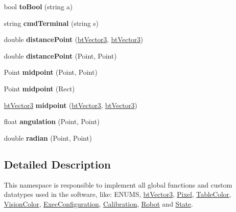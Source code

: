 \begin{DoxyCompactItemize}
\item 
bool {\bfseries to\+Bool} (string a)\hypertarget{namespacecommon_aed690e352783334b551a1c74947cb101}{}\label{namespacecommon_aed690e352783334b551a1c74947cb101}

\item 
string {\bfseries cmd\+Terminal} (string s)\hypertarget{namespacecommon_a5899229353a9bcf1570191eb9acea137}{}\label{namespacecommon_a5899229353a9bcf1570191eb9acea137}

\item 
double {\bfseries distance\+Point} (\hyperlink{structcommon_1_1btVector3}{bt\+Vector3}, \hyperlink{structcommon_1_1btVector3}{bt\+Vector3})\hypertarget{namespacecommon_ac8769b01d13707ef6598888005e643e9}{}\label{namespacecommon_ac8769b01d13707ef6598888005e643e9}

\item 
double {\bfseries distance\+Point} (Point, Point)\hypertarget{namespacecommon_a0319cc29ee430ecb0ca77d0f95cdc309}{}\label{namespacecommon_a0319cc29ee430ecb0ca77d0f95cdc309}

\item 
Point {\bfseries midpoint} (Point, Point)\hypertarget{namespacecommon_a2968370f29c08892258794b87bac33fb}{}\label{namespacecommon_a2968370f29c08892258794b87bac33fb}

\item 
Point {\bfseries midpoint} (Rect)\hypertarget{namespacecommon_a820e29c932b1f0b6a865772239beeb57}{}\label{namespacecommon_a820e29c932b1f0b6a865772239beeb57}

\item 
\hyperlink{structcommon_1_1btVector3}{bt\+Vector3} {\bfseries midpoint} (\hyperlink{structcommon_1_1btVector3}{bt\+Vector3}, \hyperlink{structcommon_1_1btVector3}{bt\+Vector3})\hypertarget{namespacecommon_a8018da38b6ea9b1dfa514730ad24ab2b}{}\label{namespacecommon_a8018da38b6ea9b1dfa514730ad24ab2b}

\item 
float {\bfseries angulation} (Point, Point)\hypertarget{namespacecommon_a8c1ef8d4ce3fdb3e30af47c9c11bf04a}{}\label{namespacecommon_a8c1ef8d4ce3fdb3e30af47c9c11bf04a}

\item 
double {\bfseries radian} (Point, Point)\hypertarget{namespacecommon_ac58a1918510dc4dbc7b65255593df38e}{}\label{namespacecommon_ac58a1918510dc4dbc7b65255593df38e}

\end{DoxyCompactItemize}


\subsection{Detailed Description}
This namespace is responsible to implement all global functions and custom datatypes used in the software, like\+: E\+N\+U\+MS, \hyperlink{structcommon_1_1btVector3}{bt\+Vector3}, \hyperlink{structcommon_1_1Pixel}{Pixel}, \hyperlink{structcommon_1_1TableColor}{Table\+Color}, \hyperlink{structcommon_1_1VisionColor}{Vision\+Color}, \hyperlink{structcommon_1_1ExecConfiguration}{Exec\+Configuration}, \hyperlink{structcommon_1_1Calibration}{Calibration}, \hyperlink{structcommon_1_1Robot}{Robot} and \hyperlink{structcommon_1_1State}{State}. 
